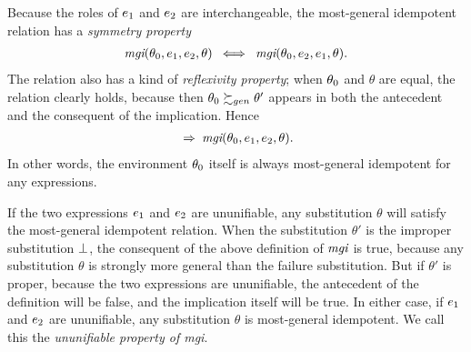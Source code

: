 \documentclass[runningheads]{llncs}
\DeclareMathOperator{\uand}{\emph{and}\,}
\DeclareMathOperator{\uimplies}{\Rightarrow}
\DeclareMathOperator{\uiff}{\iff}
\DeclareMathOperator{\mgi}{\emph{mgi}}
\begin{document}



Because the roles of $e_{1}$ and $e_{2}$ are interchangeable, the most-general idempotent relation has a \emph{symmetry property} 
\begin{align*}
 {\mgi}(\thet{0}, \e{1}, \e{2}, \theta) \,\, \uiff \,\, 
{\mgi}(\thet{0}, \e{2}, \e{1}, \theta).
   \end{align*}
The relation also has a kind of \emph{reflexivity property}; when $\theta_{0}$ and $\theta$ are equal, the relation clearly holds, because then $\theta_{0} \succsim_{gen} \theta'$ appears in both the antecedent and the consequent of the implication.  Hence
\begin{align*}
[\thet{0} = \theta] \,\, \uimplies \,\,
 {\mgi}(\thet{0}, \e{1}, \e{2}, \theta).
   \end{align*}
   \noindent In other words, the environment $\theta_{0}$ itself is always most-general idempotent for any expressions.

If the two expressions $e_{1}$ and $e_{2}$ are ununifiable, any substitution $\theta$ will satisfy the most-general idempotent relation.   When the substitution $\theta'$ is the improper substitution $\bot$, the consequent of the above definition  of $\mgi$ is true, because any substitution $\theta$ is strongly more general than the failure substitution.  But if $\theta'$ is proper, because the two expressions are ununifiable, the antecedent of the definition will be false, and the implication itself will be true.  In either case, if $e_{1}$ and $e_{2}$ are ununifiable, any substitution $\theta$ is most-general idempotent. We call this the \emph{ununifiable property of mgi}.
\end{document}
